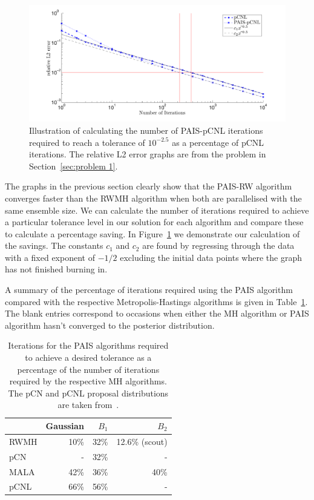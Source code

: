 \documentclass[final]{siamltex}
\begin{document}
\begin{figure}
\begin{center}
\includegraphics[width=\textwidth]{"figures/calc_saving"}
\caption{Illustration of calculating the number of PAIS-pCNL iterations required to reach a tolerance of $10^{-2.5}$ as a percentage of pCNL iterations. The relative L2 error graphs are from the problem in Section~\ref{sec:problem 1}.}
\label{fig:calc_saving}
\end{center}
\end{figure}

The graphs in the previous section clearly show that the PAIS-RW algorithm converges faster than the RWMH algorithm when both are parallelised with the same ensemble size. We can calculate the number of iterations required to achieve a particular tolerance level in our solution for each algorithm and compare these to calculate a percentage saving. In Figure~\ref{fig:calc_saving} we demonstrate our calculation of the savings. The constants $c_1$ and $c_2$ are found by regressing through the data with a fixed exponent of $-1/2$ excluding the initial data points where the graph has not finished burning in.

A summary of the percentage of iterations required using the PAIS algorithm compared with the respective Metropolis-Hastings algorithms is given in Table~\ref{table:calc_savings}. The blank entries correspond to occasions when either the MH algorithm or PAIS algorithm hasn't converged to the posterior distribution.

\begin{table}[!h]
\centering
\begin{tabular}{|l|r|r|r|}
\hline
		& Gaussian & $B_1$ & $B_2$ \\ \hline
	RWMH & 10\% & 32\% & 12.6\% (scout) \\
	pCN & - & 32\% & - \\
	MALA & 42\% & 36\% & 40\% \\
	pCNL & 66\% & 56\% & - \\ \hline
\end{tabular}
\caption{Iterations for the PAIS algorithms required to achieve a desired tolerance as a percentage of the number of iterations required by the respective MH algorithms. The pCN and pCNL proposal distributions are taken from~\cite{cotter2013mcmc}.}
\label{table:calc_savings}
\end{table}
\end{document}
